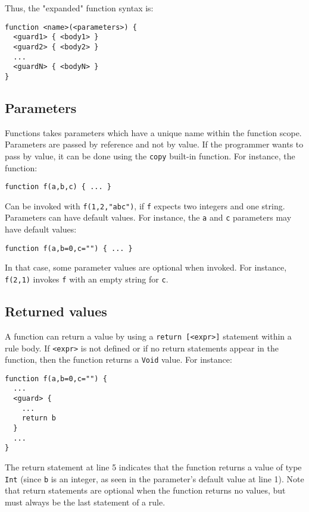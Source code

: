\documentclass[11pt]{report}
\begin{document}
Thus, the "expanded" function syntax is:

\begin{verbatim}
function <name>(<parameters>) {
  <guard1> { <body1> }
  <guard2> { <body2> }
  ...
  <guardN> { <bodyN> }
}
\end{verbatim}

\subsection{Parameters}

Functions takes parameters which have a unique name within the function scope. Parameters are passed by reference and not by value. If the programmer wants to pass by value, it can be done using the \texttt{copy} built-in function. For instance, the function:

\begin{verbatim}
function f(a,b,c) { ... }
\end{verbatim}

Can be invoked with \texttt{f(1,2,"abc")}, if \texttt{f} expects two integers and one string. Parameters can have default values. For instance, the \texttt{a} and \texttt{c} parameters may have default values:

\begin{verbatim}
function f(a,b=0,c="") { ... }
\end{verbatim}

In that case, some parameter values are optional when invoked. For instance, \texttt{f(2,1)} invokes \texttt{f} with an empty string for \texttt{c}.

\subsection{Returned values}

A function can return a value by using a \texttt{return [<expr>]} statement within a rule body. If \texttt{<expr>} is not defined or if no return statements appear in the function, then the function returns a \texttt{Void} value. For instance:

\begin{lstlisting}
function f(a,b=0,c="") {
  ...
  <guard> {
    ...
    return b
  }
  ...
}
\end{lstlisting}

The return statement at line 5 indicates that the function returns a value of type \texttt{Int} (since \texttt{b} is an integer, as seen in the parameter's default value at line 1). Note that return statements are optional when the function returns no values, but must always be the last statement of a rule.
\end{document}
